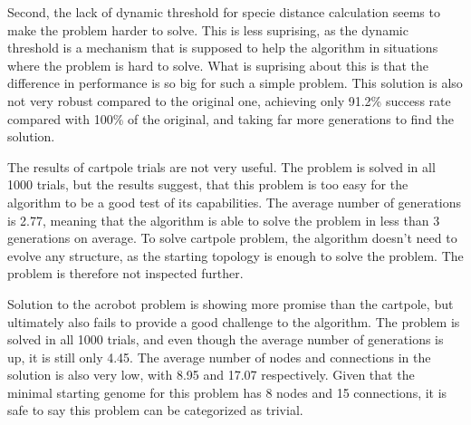 \documentclass{article}
\begin{document}
    Second, the lack of dynamic threshold for specie distance calculation seems to make the problem harder to solve.
    This is less suprising, as the dynamic threshold is a mechanism that is supposed to help the algorithm in situations
    where the problem is hard to solve. What is suprising about this is that the difference in performance is so big for
    such a simple problem. This solution is also not very robust compared to the original one, achieving only 91.2\% success rate
    compared with 100\% of the original, and taking far more generations to find the solution.

    The results of cartpole trials are not very useful. The problem is solved in all 1000 trials, but the results suggest, that 
    this problem is too easy for the algorithm to be a good test of its capabilities. The average number of generations is 2.77, 
    meaning that the algorithm is able to solve the problem in less than 3 generations on average. To solve cartpole problem, the
    algorithm doesn't need to evolve any structure, as the starting topology is enough to solve the problem. The problem is therefore
    not inspected further.

    Solution to the acrobot problem is showing more promise than the cartpole, but ultimately also fails to provide a 
    good challenge to the algorithm. The problem is solved in all 1000 trials, and even though the average number of generations is up, it 
    is still only 4.45. The average number of nodes and connections in the solution is also very low, with 8.95 and 17.07 respectively. 
    Given that the minimal starting genome for this problem has 8 nodes and 15 connections, it is safe to say this problem can be 
    categorized as trivial.
\end{document}
